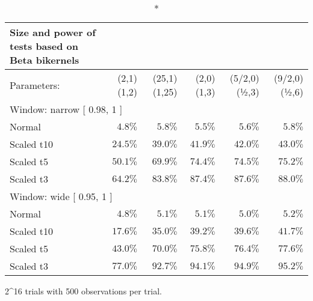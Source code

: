 \setlength{\LTpost}{0mm}
\begin{longtable}{lrrrrr}
\caption*{
{\large Size and power of tests based on Beta bikernels}
} \\ 
\toprule
Parameters: & (2,1)(1,2) & (25,1)(1,25) & (2,0)(1,3) & (5/2,0)(½,3) & (9/2,0)(½,6) \\ 
\midrule
\multicolumn{6}{l}{Window:  narrow  [ 0.98, 1 ]} \\ 
\midrule
Normal & $4.8\%$ & $5.8\%$ & $5.5\%$ & $5.6\%$ & $5.8\%$ \\ 
Scaled t10 & $24.5\%$ & $39.0\%$ & $41.9\%$ & $42.0\%$ & $43.0\%$ \\ 
Scaled t5 & $50.1\%$ & $69.9\%$ & $74.4\%$ & $74.5\%$ & $75.2\%$ \\ 
Scaled t3 & $64.2\%$ & $83.8\%$ & $87.4\%$ & $87.6\%$ & $88.0\%$ \\ 
\midrule
\multicolumn{6}{l}{Window:  wide  [ 0.95, 1 ]} \\ 
\midrule
Normal & $4.8\%$ & $5.1\%$ & $5.1\%$ & $5.0\%$ & $5.2\%$ \\ 
Scaled t10 & $17.6\%$ & $35.0\%$ & $39.2\%$ & $39.6\%$ & $41.7\%$ \\ 
Scaled t5 & $43.0\%$ & $70.0\%$ & $75.8\%$ & $76.4\%$ & $77.6\%$ \\ 
Scaled t3 & $77.0\%$ & $92.7\%$ & $94.1\%$ & $94.9\%$ & $95.2\%$ \\ 
\bottomrule
\end{longtable}
\begin{minipage}{\linewidth}
2\textasciicircum{}16 trials with 500 observations per trial.\\
\end{minipage}

